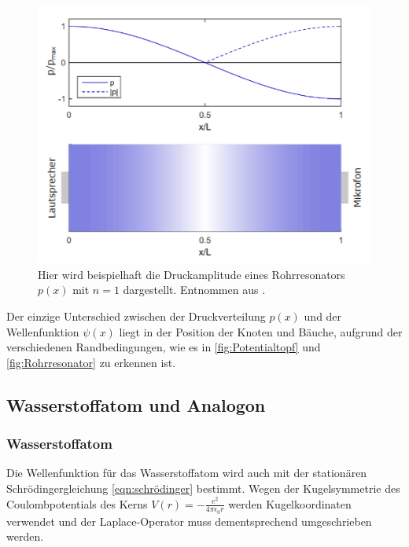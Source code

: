             \begin{figure}[h]
                \centering
                \includegraphics[scale=0.6]{pictures/Rohrresonator.png}
                \caption{Hier wird beispielhaft die Druckamplitude eines Rohrresonators $p(x)$ mit $n=1$ dargestellt. Entnommen aus \cite{httpsapphysikuni-konstanzdeap-publicanleitungenquantenmodelle-teil1pdf_quantenmodelle-teil1pdf_nodate}.}
                \label{fig:Rohrresonator}
            \end{figure}

            \FloatBarrier

            Der einzige Unterschied zwischen der Druckverteilung $p(x)$ und der Wellenfunktion $\psi(x)$ liegt in der Position der Knoten und Bäuche, aufgrund der verschiedenen Randbedingungen, wie es in \autoref{fig:Potentialtopf} und \autoref{fig:Rohrresonator} zu erkennen ist.
            
    \subsection{Wasserstoffatom und Analogon}
        \subsubsection*{Wasserstoffatom}
            Die Wellenfunktion für das Wasserstoffatom wird auch mit der stationären Schrödingergleichung \eqref{eqn:schrödinger} bestimmt. Wegen der Kugelsymmetrie des Coulombpotentials des Kerns $V(r) = -\frac{e^2}{4 \pi \epsilon_0 r}$ werden Kugelkoordinaten verwendet und der Laplace-Operator muss dementsprechend umgeschrieben werden.

